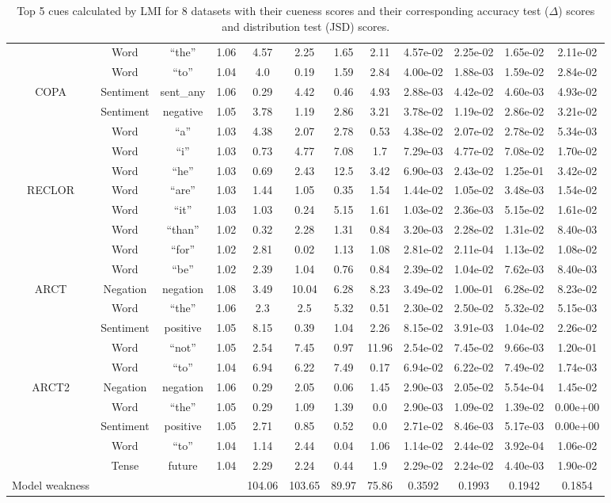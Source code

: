 \begin{table}[th]
\begin{tabular}{c|c|c|c|c|c|c|c|c|c|c|c}
&Word&``the''&1.06&4.57&2.25&1.65&2.11&4.57e-02&2.25e-02&1.65e-02&2.11e-02\\
&Word&``to''&1.04&4.0&0.19&1.59&2.84&4.00e-02&1.88e-03&1.59e-02&2.84e-02\\
	   \hline 
\multirow{5}{*}{COPA} 
&Sentiment&sent\_any&1.06&0.29&4.42&0.46&4.93&2.88e-03&4.42e-02&4.60e-03&4.93e-02\\
&Sentiment&negative&1.05&3.78&1.19&2.86&3.21&3.78e-02&1.19e-02&2.86e-02&3.21e-02\\
&Word&``a''&1.03&4.38&2.07&2.78&0.53&4.38e-02&2.07e-02&2.78e-02&5.34e-03\\
&Word&``i''&1.03&0.73&4.77&7.08&1.7&7.29e-03&4.77e-02&7.08e-02&1.70e-02\\
&Word&``he''&1.03&0.69&2.43&12.5&3.42&6.90e-03&2.43e-02&1.25e-01&3.42e-02\\
	    \hline 
\multirow{5}{*}{RECLOR} 
&Word&``are''&1.03&1.44&1.05&0.35&1.54&1.44e-02&1.05e-02&3.48e-03&1.54e-02\\
&Word&``it''&1.03&1.03&0.24&5.15&1.61&1.03e-02&2.36e-03&5.15e-02&1.61e-02\\
&Word&``than''&1.02&0.32&2.28&1.31&0.84&3.20e-03&2.28e-02&1.31e-02&8.40e-03\\
&Word&``for''&1.02&2.81&0.02&1.13&1.08&2.81e-02&2.11e-04&1.13e-02&1.08e-02\\
&Word&``be''&1.02&2.39&1.04&0.76&0.84&2.39e-02&1.04e-02&7.62e-03&8.40e-03\\
	   \hline 
\multirow{5}{*}{ARCT} 
&Negation&negation&1.08&3.49&10.04&6.28&8.23&3.49e-02&1.00e-01&6.28e-02&8.23e-02\\
&Word&``the''&1.06&2.3&2.5&5.32&0.51&2.30e-02&2.50e-02&5.32e-02&5.15e-03\\
&Sentiment&positive&1.05&8.15&0.39&1.04&2.26&8.15e-02&3.91e-03&1.04e-02&2.26e-02\\
&Word&``not''&1.05&2.54&7.45&0.97&11.96&2.54e-02&7.45e-02&9.66e-03&1.20e-01\\
&Word&``to''&1.04&6.94&6.22&7.49&0.17&6.94e-02&6.22e-02&7.49e-02&1.74e-03\\
	   \hline
\multirow{5}{*}{ARCT2} 
&Negation&negation&1.06&0.29&2.05&0.06&1.45&2.90e-03&2.05e-02&5.54e-04&1.45e-02\\
&Word&``the''&1.05&0.29&1.09&1.39&0.0&2.90e-03&1.09e-02&1.39e-02&0.00e+00\\
&Sentiment&positive&1.05&2.71&0.85&0.52&0.0&2.71e-02&8.46e-03&5.17e-03&0.00e+00\\
&Word&``to''&1.04&1.14&2.44&0.04&1.06&1.14e-02&2.44e-02&3.92e-04&1.06e-02\\
&Tense&future&1.04&2.29&2.24&0.44&1.9&2.29e-02&2.24e-02&4.40e-03&1.90e-02\\
\hline
Model weakness & & & & 104.06 & 103.65 & 89.97 & 75.86 &0.3592&0.1993&0.1942&0.1854 \\
\hline 
\end{tabular}
\caption{Top 5 cues calculated by LMI for 8 datasets with their cueness scores and their corresponding accuracy test ($\Delta$) scores and distribution test (JSD) scores.}\label{tab:bias}
\end{table}

